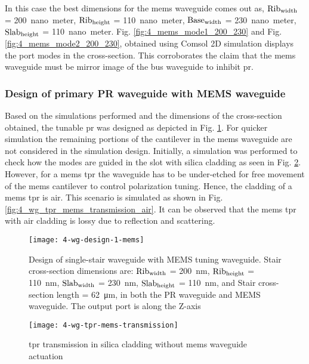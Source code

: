 \documentclass[../report.tex]{subfiles}
\begin{document}
In this case the best dimensions for the \gls{mems} waveguide comes out as, $\mathrm{Rib_{width}}$ = \SI{200}{nano meter}, $\mathrm{Rib_{height}}$ = \SI{110}{nano meter}, $\mathrm{Base_{width}}$ = \SI{230}{nano meter}, $\mathrm{Slab_{height}}$ = \SI{110}{nano meter}. Fig. \ref{fig:4_mems_mode1_200_230} and Fig. \ref{fig:4_mems_mode2_200_230}, obtained using Comsol 2D simulation displays the port modes in the cross-section. This corroborates the claim that the \gls{mems} waveguide must be mirror image of the bus waveguide to inhibit \gls{pr}.

\subsubsection{Design of primary PR waveguide with MEMS waveguide}			
Based on the simulations performed and the dimensions of the cross-section obtained, the tunable \gls{pr} was designed as depicted in Fig. \ref{fig:4_wg_design_1_mems}. For quicker simulation the remaining portions of the cantilever in the \gls{mems} waveguide are not considered in the simulation design. Initially, a simulation was performed to check how the modes are guided in the slot with silica cladding as seen in Fig. \ref{fig:4_wg_tpr_mems_transmission}. However, for a \gls{mems} \gls{tpr} the waveguide has to be under-etched for free movement of the \gls{mems} cantilever to control polarization tuning. Hence, the cladding of a \gls{mems} \gls{tpr} is air. This scenario is simulated as shown in Fig. \ref{fig:4_wg_tpr_mems_transmission_air}. It can be observed that the \gls{mems} \gls{tpr} with air cladding is lossy due to reflection and scattering. 

\begin{figure}[H] %
	\centering
	\texttt{[image: 4-wg-design-1-mems]}
	\caption{Design of single-stair waveguide with MEMS tuning waveguide. Stair cross-section dimensions are: $\mathrm{Rib_{width}}$ = \SI{200}{\nano \meter}, $\mathrm{Rib_{height}}$ = \SI{110}{\nano \meter}, $\mathrm{Slab_{width}}$ = \SI{230}{\nano \meter}, $\mathrm{Slab_{height}}$ = \SI{110}{\nano \meter}, and Stair cross-section length = \SI{62}{\micro\meter}, in both the PR waveguide and MEMS waveguide. The output port is along the Z-axis}
	\label{fig:4_wg_design_1_mems}
\end{figure}

\begin{figure}[H] %
	\centering
	\texttt{[image: 4-wg-tpr-mems-transmission]}
	\caption{\gls{tpr} transmission in silica cladding without \gls{mems} waveguide actuation}
	\label{fig:4_wg_tpr_mems_transmission}
\end{figure}
\end{document}
